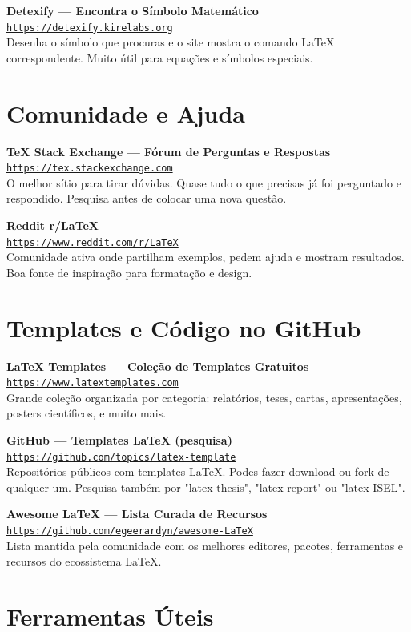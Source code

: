 \documentclass[12pt]{article}
\newcommand{\recurso}[3]{%
    \begin{mdframed}[style=resourcebox]
        \textbf{#1}\\[3pt]
        \href{#2}{\textcolor{linkblue}{\small\texttt{#2}}}\\[5pt]
        \small #3
    \end{mdframed}
}
\begin{document}
\recurso{Detexify — Encontra o Símbolo Matemático}
    {https://detexify.kirelabs.org}
    {Desenha o símbolo que procuras e o site mostra o comando LaTeX
     correspondente. Muito útil para equações e símbolos especiais.}


\section{Comunidade e Ajuda}

\recurso{TeX Stack Exchange — Fórum de Perguntas e Respostas}
    {https://tex.stackexchange.com}
    {O melhor sítio para tirar dúvidas. Quase tudo o que precisas já foi
     perguntado e respondido. Pesquisa antes de colocar uma nova questão.}

\recurso{Reddit r/LaTeX}
    {https://www.reddit.com/r/LaTeX}
    {Comunidade ativa onde partilham exemplos, pedem ajuda e mostram
     resultados. Boa fonte de inspiração para formatação e design.}


\section{Templates e Código no GitHub}

\recurso{LaTeX Templates — Coleção de Templates Gratuitos}
    {https://www.latextemplates.com}
    {Grande coleção organizada por categoria: relatórios, teses, cartas,
     apresentações, posters científicos, e muito mais.}

\recurso{GitHub — Templates LaTeX (pesquisa)}
    {https://github.com/topics/latex-template}
    {Repositórios públicos com templates LaTeX. Podes fazer download ou
     fork de qualquer um. Pesquisa também por "latex thesis", "latex
     report" ou "latex ISEL".}

\recurso{Awesome LaTeX — Lista Curada de Recursos}
    {https://github.com/egeerardyn/awesome-LaTeX}
    {Lista mantida pela comunidade com os melhores editores, pacotes,
     ferramentas e recursos do ecossistema LaTeX.}


\section{Ferramentas Úteis}
\end{document}
